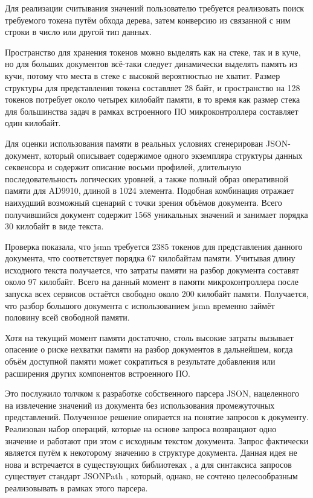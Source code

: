 \documentclass{report}
\begin{document}
Для реализации считывания значений пользователю требуется реализовать поиск требуемого токена путём обхода дерева, затем конверсию из связанной с ним строки в число или другой тип данных.

Пространство для хранения токенов можно выделять как на стеке, так и в куче, но для больших документов всё-таки следует динамически выделять память из кучи, потому что места в стеке с высокой вероятностью не хватит. Размер структуры для представления токена составляет 28 байт, и пространство на 128 токенов потребует около четырех килобайт памяти, в то время как размер стека для большинства задач в рамках встроенного ПО микроконтроллера составляет один килобайт.

Для оценки использования памяти в реальных условиях сгенерирован JSON-документ, который описывает содержимое одного экземпляра структуры данных секвенсора и содержит описание восьми профилей, длительную последовательность логических уровней, а также полный образ оперативной памяти для AD9910, длиной в 1024 элемента. Подобная комбинация отражает наихудший возможный сценарий с точки зрения объёмов документа. Всего получившийся документ содержит 1568 уникальных значений и занимает порядка 30 килобайт в виде текста.

Проверка показала, что jsmn требуется 2385 токенов для представления данного документа, что соответствует порядка 67 килобайтам памяти. Учитывая длину исходного текста получается, что затраты памяти на разбор документа составят около 97 килобайт. Всего на данный момент в памяти микроконтроллера после запуска всех сервисов остаётся свободно около 200 килобайт памяти. Получается, что разбор большого документа с использованием jsmn временно займёт половину всей свободной памяти.

Хотя на текущий момент памяти достаточно, столь высокие затраты вызывает опасение о риске нехватки памяти на разбор документов в дальнейшем, когда объём доступной памяти может сократиться в результате добавления или расширения других компонентов встроенного ПО.

Это послужило толчком к разработке собственного парсера JSON, нацеленного на извлечение значений из документа без использования промежуточных представлений. Полученное решение опирается на понятие запросов к документу. Реализован набор операций, которые на основе запроса возвращают одно значение и работают при этом с исходным текстом документа. Запрос фактически является путём к некоторому значению в структуре документа. Данная идея не нова и встречается в существующих библиотеках \cite{jread}, а для синтаксиса запросов существует стандарт JSONPath \cite{jsonpath}, который, однако, не сочтено целесообразным реализовывать в рамках этого парсера.
\end{document}
